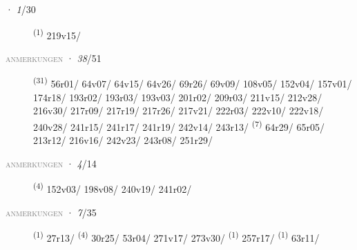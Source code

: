\noindent{} · \textit{1}/30 \LEMMALINE
\begin{description}
    \item[]  \textsuperscript{(1)} \mbox{219v15/}
\end{description}
\textsc{\textcolor{gray}{anmerkungen}}
\ENTRYEND
\noindent{} · \textit{38}/51 \LEMMALINE
\begin{description}
    \item[]  \textsuperscript{(31)} \mbox{56r01/} \mbox{64v07/} \mbox{64v15/} \mbox{64v26/} \mbox{69r26/} \mbox{69v09/} \mbox{108v05/} \mbox{152v04/} \mbox{157v01/} \mbox{174r18/} \mbox{193r02/} \mbox{193r03/} \mbox{193v03/} \mbox{201r02/} \mbox{209r03/} \mbox{211v15/} \mbox{212v28/} \mbox{216v30/} \mbox{217r09/} \mbox{217r19/} \mbox{217r26/} \mbox{217v21/} \mbox{222r03/} \mbox{222v10/} \mbox{222v18/} \mbox{240v28/} \mbox{241r15/} \mbox{241r17/} \mbox{241r19/} \mbox{242v14/} \mbox{243r13/} \CASEBREAK {} \textsuperscript{(7)} \mbox{64r29/} \mbox{65r05/} \mbox{213r12/} \mbox{216v16/} \mbox{242v23/} \mbox{243r08/} \mbox{251r29/}
\end{description}
\textsc{\textcolor{gray}{anmerkungen}}
\ENTRYEND
\noindent{} · \textit{4}/14 \LEMMALINE
\begin{description}
    \item[]  \textsuperscript{(4)} \mbox{152v03/} \mbox{198v08/} \mbox{240v19/} \mbox{241r02/}
\end{description}
\textsc{\textcolor{gray}{anmerkungen}}
\ENTRYEND
\noindent{} · \textit{7}/35 \LEMMALINE
\begin{description}
    \item[]  \textsuperscript{(1)} \mbox{27r13/} \CASEBREAK {} \textsuperscript{(4)} \mbox{30r25/} \mbox{53r04/} \mbox{271v17/} \mbox{273v30/} \textsuperscript{(1)} \mbox{257r17/} \CASEBREAK {} \textsuperscript{(1)} \mbox{63r11/}
\end{description}
